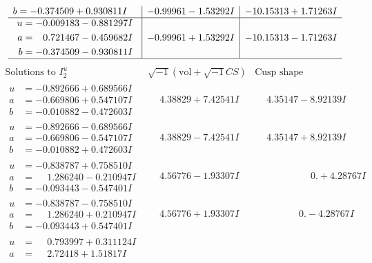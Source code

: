 \documentclass[1p]{elsarticle_modified}
\theoremstyle{definition}
\newcommand{\I}{\sqrt{-1}}
\begin{document}
$$\begin{array}{c|c|c}
\begin{aligned}
b &= -0.374509 + 0.930811 I\end{aligned}
 & -0.99961 - 1.53292 I & -10.15313 + 1.71263 I \\ \hline\begin{aligned}
u &= -0.009183 - 0.881297 I \\
a &= \phantom{-}0.721467 - 0.459682 I \\
b &= -0.374509 - 0.930811 I\end{aligned}
 & -0.99961 + 1.53292 I & -10.15313 - 1.71263 I\\
 \hline 
 \end{array}$$\newpage$$\begin{array}{c|c|c}  
\text{Solutions to }I^u_{2}& \I (\text{vol} + \sqrt{-1}CS) & \text{Cusp shape}\\
 \hline 
\begin{aligned}
u &= -0.892666 + 0.689566 I \\
a &= -0.669806 + 0.547107 I \\
b &= -0.010882 - 0.472603 I\end{aligned}
 & \phantom{-}4.38829 + 7.42541 I & \phantom{-}4.35147 - 8.92139 I \\ \hline\begin{aligned}
u &= -0.892666 - 0.689566 I \\
a &= -0.669806 - 0.547107 I \\
b &= -0.010882 + 0.472603 I\end{aligned}
 & \phantom{-}4.38829 - 7.42541 I & \phantom{-}4.35147 + 8.92139 I \\ \hline\begin{aligned}
u &= -0.838787 + 0.758510 I \\
a &= \phantom{-}1.286240 - 0.210947 I \\
b &= -0.093443 - 0.547401 I\end{aligned}
 & \phantom{-}4.56776 - 1.93307 I & \phantom{-0.000000 -}0. + 4.28767 I \\ \hline\begin{aligned}
u &= -0.838787 - 0.758510 I \\
a &= \phantom{-}1.286240 + 0.210947 I \\
b &= -0.093443 + 0.547401 I\end{aligned}
 & \phantom{-}4.56776 + 1.93307 I & \phantom{-0.000000 } 0. - 4.28767 I \\ \hline\begin{aligned}
u &= \phantom{-}0.793997 + 0.311124 I \\
a &= \phantom{-}2.72418 + 1.51817 I \\

\end{aligned}
\end{array}$$
\end{document}
